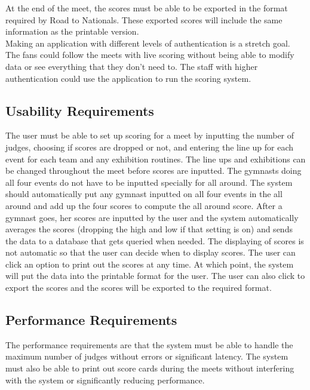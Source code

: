 \documentclass[letterpaper,10pt,draftclsnofoot,onecolumn,]{article}
\begin{document}
\noindent At the end of the meet, the scores must be able to be exported in the format required by Road to Nationals. These exported scores will include the same information as the printable version.\\

\noindent Making an application with different levels of authentication is a stretch goal. The fans could follow the meets with live scoring without being able to modify data or see everything that they don't need to. The staff with higher authentication could use the application to run the scoring system.

\subsection{Usability Requirements}
The user must be able to set up scoring for a meet by inputting the number of judges, choosing if scores are dropped or not, and entering the line up for each event for each team and any exhibition routines. The line ups and exhibitions can be changed throughout the meet before scores are inputted. The gymnasts doing all four events do not have to be inputted specially for all around. The system should automatically put any gymnast inputted on all four events in the all around and add up the four scores to compute the all around score. After a gymnast goes, her scores are inputted by the user and the system automatically averages the scores (dropping the high and low if that setting is on) and sends the data to a database that gets queried when needed. The displaying of scores is not automatic so that the user can decide when to display scores. The user can click an option to print out the scores at any time. At which point, the system will put the data into the printable format for the user. The user can also click to export the scores and the scores will be exported to the required format.\\

\subsection{Performance Requirements}
The performance requirements are that the system must be able to handle the maximum number of judges without errors or significant latency. The system must also be able to print out score cards during the meets without interfering with the system or significantly reducing performance.
\end{document}

